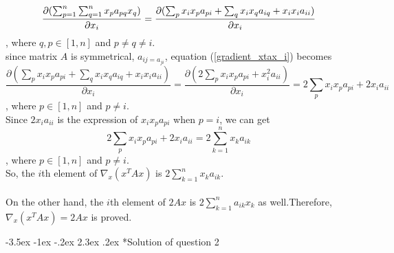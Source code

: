 \documentclass[12pt]{article}
\makeatletter
\renewcommand\section{\@startsection {section}{1}{\z@}%
	{-3.5ex \@plus -1ex \@minus -.2ex}%
	{2.3ex \@plus.2ex}%
	{\normalfont\large\bfseries}}%
\makeatother
\begin{document}
	\begin{equation}\label{gradient_xtax_i}
	\frac{\partial(\sum_{p=1}^n \sum_{q=1}^n x_pa_{pq}x_q)}{\partial x_i} \\
	=\frac{\partial(\sum_{p} x_ix_pa_{pi}+\sum_{q} x_ix_qa_{iq}+x_ix_ia_{ii})}{\partial x_i}
	\end{equation}
	, where $q, p \in [1, n]$ and $p\neq q\neq i$.
	\\
	since matrix $A$ is symmetrical, $a_{ij=a_{ji}}$, equation (\ref{gradient_xtax_i}) becomes
	\begin{equation}\label{gradient_xtax_i_mod}
	\frac{\partial(\sum_{p} x_ix_pa_{pi}+\sum_{q} x_ix_qa_{iq}+x_ix_ia_{ii})}{\partial x_i}
	=\frac{\partial(2\sum_{p} x_ix_pa_{pi}+x_i^2a_{ii})}{\partial x_i}
	=2\sum_{p} x_ix_pa_{pi}+2x_ia_{ii}
	\end{equation}
	, where $p \in [1, n]$ and $p\neq i$.\\
	Since $2x_ia_{ii}$ is the expression of $x_ix_pa_{pi}$ when $p=i$, we can get
	\begin{equation}\label{gradient_xtax_i_final}
	2\sum_{p} x_ix_pa_{pi}+2x_ia_{ii}
	=2\sum_{k=1}^n x_ka_{ik}
	\end{equation}
	, where $p \in [1, n]$ and $p\neq i$.\\
	So, the $i$th element of $\nabla_x(x^TAx)$ is $2\sum_{k=1}^n x_ka_{ik}$.\\
	\\
	\noindent
	On the other hand, the $i$th element of $2Ax$ is $2\sum_{k=1}^n a_{ik}x_k$ as well.Therefore, $\nabla_x(x^TAx)=2Ax$ is proved.
	
	\section*{Solution of question 2}
	
\end{document}

